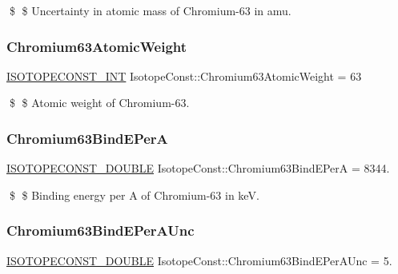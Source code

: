 \$ \$ Uncertainty in atomic mass of Chromium-\/63 in amu. \mbox{\label{group___isotope_const-_chromium-_cr63_gad5ad34737443098f363914194b0b6ca9}} 
\subsubsection{\texorpdfstring{Chromium63\+Atomic\+Weight}{Chromium63AtomicWeight}}
{\footnotesize\ttfamily \mbox{\hyperlink{group___isotope_const-_macros_ga5f18360b3e99483a35c32d789e62621c}{I\+S\+O\+T\+O\+P\+E\+C\+O\+N\+S\+T\+\_\+\+I\+NT}} Isotope\+Const\+::\+Chromium63\+Atomic\+Weight = 63}

\$ \$ Atomic weight of Chromium-\/63. \mbox{\label{group___isotope_const-_chromium-_cr63_gad152965e09e8be8d30fec2e418a4a9b1}} 
\subsubsection{\texorpdfstring{Chromium63\+Bind\+E\+PerA}{Chromium63BindEPerA}}
{\footnotesize\ttfamily \mbox{\hyperlink{group___isotope_const-_macros_ga8f45a7272ce02c0b4c65c44636ed719a}{I\+S\+O\+T\+O\+P\+E\+C\+O\+N\+S\+T\+\_\+\+D\+O\+U\+B\+LE}} Isotope\+Const\+::\+Chromium63\+Bind\+E\+PerA = 8344.}

\$ \$ Binding energy per A of Chromium-\/63 in keV. \mbox{\label{group___isotope_const-_chromium-_cr63_ga818de753c963ca75899319e455c9e6da}} 
\subsubsection{\texorpdfstring{Chromium63\+Bind\+E\+Per\+A\+Unc}{Chromium63BindEPerAUnc}}
{\footnotesize\ttfamily \mbox{\hyperlink{group___isotope_const-_macros_ga8f45a7272ce02c0b4c65c44636ed719a}{I\+S\+O\+T\+O\+P\+E\+C\+O\+N\+S\+T\+\_\+\+D\+O\+U\+B\+LE}} Isotope\+Const\+::\+Chromium63\+Bind\+E\+Per\+A\+Unc = 5.}

